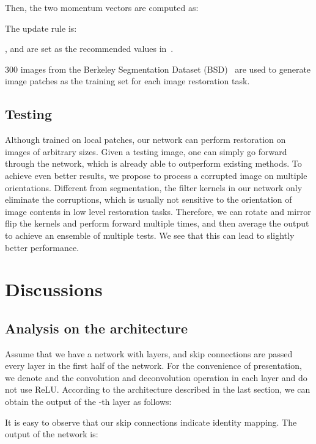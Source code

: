 \documentclass[10pt,journal,compsoc]{IEEEtran}
\begin{document}
Then, the two momentum vectors are computed as:

The update rule is:

,  and  are set as the recommended values in~\cite{DBLP:journals/corr/KingmaB14}.

300 images from the Berkeley Segmentation Dataset (BSD)~\cite{MartinFTM01} are used to
generate image patches as the training set for each image restoration task.





\subsection{Testing}

Although trained on local patches, our network can perform restoration on images of arbitrary sizes.
Given a testing image, one can simply go forward through the network, which is already able to
 outperform existing methods. To achieve even better results, we propose
to process a corrupted image on multiple orientations. Different from segmentation, the
filter kernels in our network only eliminate the corruptions, which is usually not sensitive
to the orientation of image contents in low level restoration tasks. Therefore, we can rotate
and mirror flip the kernels and perform forward multiple times, and then average the output to
achieve an ensemble of multiple tests. We see that this can lead to slightly better performance.
 \section{Discussions}

\label{sec:disc}


\subsection{Analysis on the architecture}

Assume that we have a network with  layers, and skip connections are passed every
layer in the first half of the network. For the convenience of presentation, we
denote  and   the convolution and deconvolution operation in each layer
and do not use ReLU. According to the architecture described in the last section,
we can obtain the output of the -th layer as follows:

It is easy to observe that our skip connections indicate identity mapping.
The output of the network is:
\end{document}
